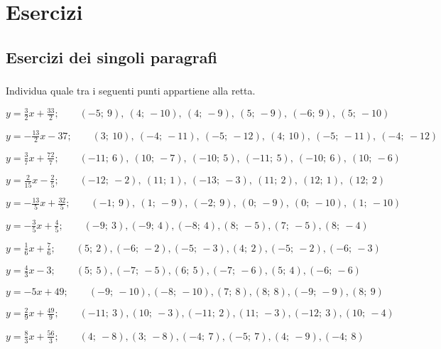 
\section{Esercizi}

\subsection{Esercizi dei singoli paragrafi}

\subsubsection*{}

\begin{esercizio}\label{ese:}
 Individua quale tra i seguenti punti appartiene alla retta.
 \begin{enumeratea}
  \item  $y = \frac{3}{2} x +\frac{33}{2};\quad \quad (-5;~9),~(4;~-10),~(4;~-9),~(5;~-9),~(-6;~9),~(5;~-10)$
  \item  $y = -\frac{13}{2} x -37;\quad \quad (3;~10),~(-4;~-11),~(-5;~-12),~(4;~10),~(-5;~-11),~(-4;~-12)$
  \item  $y = \frac{3}{7} x +\frac{72}{7};\quad \quad (-11;~6),~(10;~-7),~(-10;~5),~(-11;~5),~(-10;~6),~(10;~-6)$
  \item  $y = \frac{2}{15} x -\frac{2}{5};\quad \quad (-12;~-2),~(11;~1),~(-13;~-3),~(11;~2),~(12;~1),~(12;~2)$
  \item  $y = -\frac{13}{5} x +\frac{32}{5};\quad \quad (-1;~9),~(1;~-9),~(-2;~9),~(0;~-9),~(0;~-10),~(1;~-10)$
  \item  $y = -\frac{3}{5} x +\frac{4}{5};\quad \quad (-9;~3), (-9;~4), (-8;~4), (8;~-5), (7;~-5), (8;~-4)$
  \item  $y = \frac{1}{6} x +\frac{7}{6};\quad \quad (5;~2), (-6;~-2), (-5;~-3), (4;~2), (-5;~-2), (-6;~-3)$
  \item  $y = \frac{4}{3} x -3;\quad \quad (5;~5), (-7;~-5), (6;~5), (-7;~-6), (5;~4), (-6;~-6)$
  \item  $y = -5 x +49;\quad \quad (-9;~-10), (-8;~-10), (7;~8), (8;~8), (-9;~-9), (8;~9)$
  \item  $y = \frac{2}{9} x +\frac{49}{9};\quad \quad (-11;~3), (10;~-3), (-11;~2), (11;~-3), (-12;~3), (10;~-4)$
  \item  $y = \frac{8}{3} x +\frac{56}{3};\quad \quad (4;~-8), (3;~-8), (-4;~7), (-5;~7), (4;~-9), (-4;~8)$

\end{enumeratea}
\end{esercizio}
